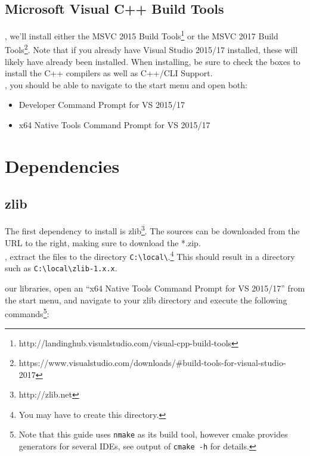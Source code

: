 \documentclass{tufte-handout}
\begin{document}
\subsection{Microsoft Visual C++ Build Tools}

, we'll install either the MSVC 2015 Build 
Tools\footnote{http://landinghub.visualstudio.com/visual-cpp-build-tools} or the MSVC 2017 Build
Tools\footnote{https://www.visualstudio.com/downloads/\#build-tools-for-visual-studio-2017}.
Note that if you already have Visual Studio 2015/17 installed, these will likely have already
been installed.  When installing, be sure to check the boxes to install the C++ compilers as well 
as C++/CLI Support. \\ 

, you should be able to navigate to the start menu and open both:
\begin{itemize}
    
    \item Developer Command Prompt for VS 2015/17
    \item x64 Native Tools Command Prompt for VS 2015/17

\end{itemize}

\section{Dependencies}

\subsection{zlib}

The first dependency to install is zlib\footnote{http://zlib.net}.  The sources can be downloaded
from the URL to the right, making sure to download the *.zip. \\

    , extract the files to the directory \Verb|C:\local\|.\footnote{
    You may have to create this directory.}  This should result in a directory such as
    \Verb|C:\local\zlib-1.x.x|.

     our libraries, open an ``x64 Native Tools Command Prompt for VS 2015/17''
    from the start menu, and navigate to your zlib directory and execute the following 
    commands\footnote{Note that this guide uses \Verb|nmake| as its build tool, however cmake provides
    generators for several IDEs, see output of \Verb|cmake -h| for details.}:
\end{document}
